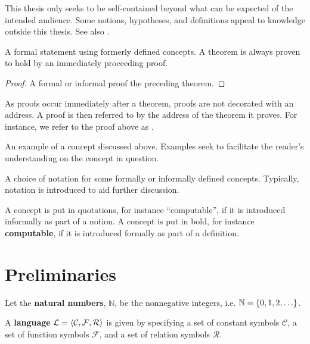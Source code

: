 This thesis only seeks to be self-contained beyond what can be expected of the
intended audience. Some notions, hypotheses, and definitions appeal to
knowledge outside this thesis. See also .

\begin{theorem} \label{thm:theorem} A formal statement using formerly
defined concepts. A theorem is always proven to hold by an immediately
proceeding proof.\end{theorem}

\begin{proof} A formal or informal proof the preceding theorem. \end{proof}

As proofs occur immediately after a theorem, proofs are not decorated with an
address. A proof is then referred to by the address of the theorem it proves.
For instance, we refer to the proof above as .

\begin{example} An example of a concept discussed above. Examples seek to
facilitate the reader's understanding on the concept in question.
\end{example}

\begin{notation}

A choice of notation for some formally or informally defined concepts.
Typically, notation is introduced to aid further discussion.

\end{notation}

A concept is put in quotations, for instance ``computable'', if it is
introduced informally as part of a notion. A concept is put in bold, for
instance \textbf{computable}, if it is introduced formally as part of a
definition.

\section{Preliminaries}

\begin{notion}

Let the \textbf{natural numbers}, $\mathbb{N}$, be the nonnegative integers,
i.e.  $\mathbb{N}=\mathopen{}\left\{{0,1,2,\ldots}\right\}\mathclose{}$.

\end{notion}

\begin{definition}

A \textbf{language} $\mathcal{L}=\mathopen{}\left\langle{\mathcal{C},\mathcal{F}, \mathcal{R}}\right\rangle\mathclose{}$
is given by specifying a set of constant symbols $\mathcal{C}$, a set of
function symbols $\mathcal{F}$, and a set of relation symbols $\mathcal{R}$.

\end{definition}

